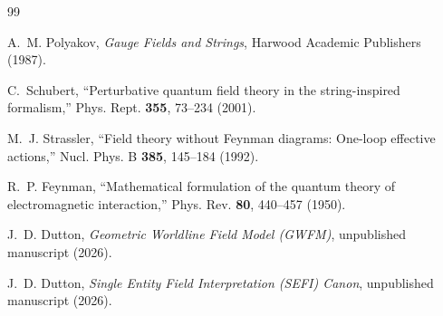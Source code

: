 \documentclass[12pt]{article}
\begin{document}
\begin{thebibliography}{99}

A.~M. Polyakov, \textit{Gauge Fields and Strings}, Harwood Academic Publishers (1987).

C.~Schubert, ``Perturbative quantum field theory in the string-inspired formalism,''
Phys. Rept. \textbf{355}, 73--234 (2001).

M.~J. Strassler, ``Field theory without Feynman diagrams: One-loop effective actions,''
Nucl. Phys. B \textbf{385}, 145--184 (1992).

R.~P. Feynman, ``Mathematical formulation of the quantum theory of electromagnetic interaction,''
Phys. Rev. \textbf{80}, 440--457 (1950).

J.~D. Dutton, \textit{Geometric Worldline Field Model (GWFM)}, unpublished manuscript (2026).

J.~D. Dutton, \textit{Single Entity Field Interpretation (SEFI) Canon}, unpublished manuscript (2026).

\end{thebibliography}
\end{document}
